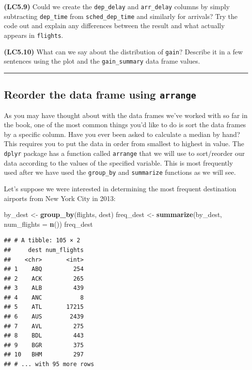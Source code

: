 \documentclass[]{tufte-book}
\newenvironment{Shaded}{\begin{snugshade}}{\end{snugshade}}
\newcommand{\KeywordTok}[1]{\textcolor[rgb]{0.13,0.29,0.53}{\textbf{{#1}}}}
\newcommand{\DataTypeTok}[1]{\textcolor[rgb]{0.13,0.29,0.53}{{#1}}}
\newcommand{\StringTok}[1]{\textcolor[rgb]{0.31,0.60,0.02}{{#1}}}
\newcommand{\NormalTok}[1]{{#1}}
\let\oldrule=\rule
\renewcommand{\rule}[1]{\oldrule{\linewidth}}
\begin{document}
\textbf{(LC5.9)} Could we create the \texttt{dep\_delay} and
\texttt{arr\_delay} columns by simply subtracting \texttt{dep\_time}
from \texttt{sched\_dep\_time} and similarly for arrivals? Try the code
out and explain any differences between the result and what actually
appears in \texttt{flights}.

\textbf{(LC5.10)} What can we say about the distribution of
\texttt{gain}? Describe it in a few sentences using the plot and the
\texttt{gain\_summary} data frame values.

\begin{center}\rule{0.5\linewidth}{\linethickness}\end{center}

\subsection{\texorpdfstring{Reorder the data frame using
\texttt{arrange}}{Reorder the data frame using arrange}}\label{reorder-the-data-frame-using-arrange}

As you may have thought about with the data frames we've worked with so
far in the book, one of the most common things you'd like to do is sort
the data frames by a specific column. Have you ever been asked to
calculate a median by hand? This requires you to put the data in order
from smallest to highest in value. The \texttt{dplyr} package has a
function called \texttt{arrange} that we will use to sort/reorder our
data according to the values of the specified variable. This is most
frequently used after we have used the \texttt{group\_by} and
\texttt{summarize} functions as we will see.

Let's suppose we were interested in determining the most frequent
destination airports from New York City in 2013:

\begin{Shaded}
\begin{Highlighting}[]
\NormalTok{by_dest <-}\StringTok{ }\KeywordTok{group_by}\NormalTok{(flights, dest)}
\NormalTok{freq_dest <-}\StringTok{ }\KeywordTok{summarize}\NormalTok{(by_dest, }\DataTypeTok{num_flights =} \KeywordTok{n}\NormalTok{())}
\NormalTok{freq_dest}
\end{Highlighting}
\end{Shaded}

\begin{verbatim}
## # A tibble: 105 × 2
##     dest num_flights
##    <chr>       <int>
## 1    ABQ         254
## 2    ACK         265
## 3    ALB         439
## 4    ANC           8
## 5    ATL       17215
## 6    AUS        2439
## 7    AVL         275
## 8    BDL         443
## 9    BGR         375
## 10   BHM         297
## # ... with 95 more rows
\end{verbatim}
\end{document}
